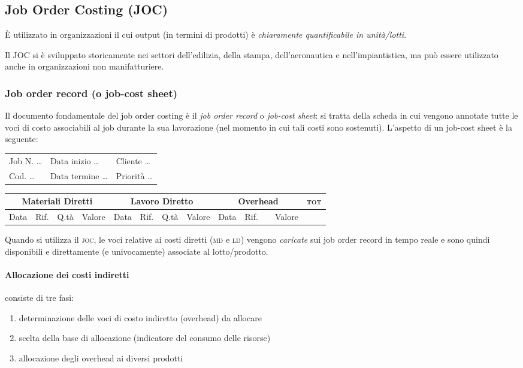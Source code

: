 \subsection{Job Order Costing (JOC)}
È utilizzato in organizzazioni il cui output (in termini di prodotti) è
\emph{chiaramente quantificabile in unità/lotti}.

Il \textsc{JOC} si è sviluppato storicamente nei settori dell'edilizia,
della stampa, dell'aeronautica e nell'impiantistica, ma 
può essere utilizzato anche in organizzazioni non manifatturiere.

\subsubsection{Job order record (o job-cost sheet)}
Il documento fondamentale del job order costing è il \emph{job order record}
o \emph{job-cost sheet}: si tratta della scheda in cui vengono annotate tutte
le voci di costo associabili al job durante la sua lavorazione (nel
momento in cui tali costi sono sostenuti). L'aspetto di un job-cost sheet è la seguente:

\vspace{1em}
\begin{tabular}{l l l}
    Job N. \dots & Data inizio \dots & Cliente \dots \\
    Cod. \dots & Data termine \dots & Priorità \dots \\
\end{tabular}
\newline
\vspace{1em}
\begin{tabular}{|c|c|c|c|c|c|c|c|c|c|c|c|c|}
    \hline
    \multicolumn{4}{|c|}{Materiali Diretti} & \multicolumn{4}{c}{Lavoro Diretto} & \multicolumn{4}{|c|}{Overhead} & \textsc{tot} \\
    \hline
    Data & Rif. & Q.tà & Valore & Data & Rif. & Q.tà & Valore & Data & Rif. &  & Valore & \\
    \hline
\end{tabular}


Quando si utilizza il \textsc{joc}, le voci relative ai costi diretti (\textsc{md} e \textsc{ld})
vengono \emph{caricate} sui job order record in tempo reale e sono quindi
disponibili e direttamente (e univocamente) associate al lotto/prodotto.

\paragraph{Allocazione dei costi indiretti} consiste di tre fasi:
\begin{enumerate}
    \item determinazione delle voci di costo indiretto (overhead) da
    allocare
    \item scelta della base di allocazione (indicatore del consumo delle
    risorse)
    \item allocazione degli overhead ai diversi prodotti
\end{enumerate}


